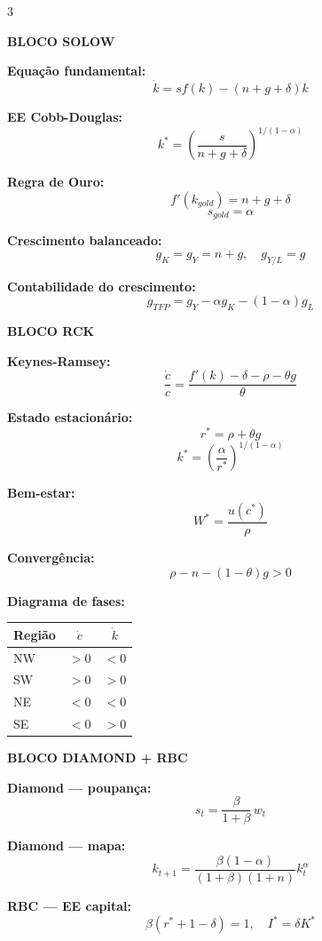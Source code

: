 \documentclass[12pt, a4paper]{article}
\begin{document}
\vspace{0.3em}
\begin{multicols}{3}

\textbf{\textcolor{cyanrbc}{BLOCO SOLOW}}

\medskip
\textbf{Equação fundamental:}
\[
\dot{k} = sf(k) - (n+g+\delta)k
\]

\textbf{EE Cobb-Douglas:}
\[
k^* = \!\left(\frac{s}{n+g+\delta}\right)^{\!1/(1-\alpha)}
\]

\textbf{Regra de Ouro:}
\[
f'(k_{gold}) = n+g+\delta
\]
\[
s_{gold} = \alpha
\]

\textbf{Crescimento balanceado:}
\[
g_K = g_Y = n+g,\quad g_{Y/L} = g
\]

\textbf{Contabilidade do crescimento:}
\[
g_{TFP} = g_Y - \alpha g_K - (1-\alpha)g_L
\]

\columnbreak

\textbf{\textcolor{cyanrbc}{BLOCO RCK}}

\medskip
\textbf{Keynes-Ramsey:}
\[
\frac{\dot{c}}{c} = \frac{f'(k)-\delta-\rho-\theta g}{\theta}
\]

\textbf{Estado estacionário:}
\[
r^* = \rho + \theta g
\]
\[
k^* = \!\left(\frac{\alpha}{r^*}\right)^{\!1/(1-\alpha)}
\]

\textbf{Bem-estar:}
\[
W^* = \frac{u(c^*)}{\rho}
\]

\textbf{Convergência:}
\[
\rho - n - (1-\theta)g > 0
\]

\textbf{Diagrama de fases:}

\begin{center}
\begin{tabular}{p{1.4cm}cc}
\toprule
Região & $\dot{c}$ & $\dot{k}$ \\
\midrule
NW & $>0$ & $<0$ \\
SW & $>0$ & $>0$ \\
NE & $<0$ & $<0$ \\
SE & $<0$ & $>0$ \\
\bottomrule
\end{tabular}
\end{center}

\columnbreak

\textbf{\textcolor{cyanrbc}{BLOCO DIAMOND + RBC}}

\medskip
\textbf{Diamond --- poupança:}
\[
s_t = \frac{\beta}{1+\beta}\,w_t
\]

\textbf{Diamond --- mapa:}
\[
k_{t+1} = \frac{\beta(1-\alpha)}{(1+\beta)(1+n)}k_t^\alpha
\]

\textbf{RBC --- EE capital:}
\[
\beta(r^*+1-\delta)=1,\quad I^*=\delta K^*
\]


\end{multicols}
\end{document}

